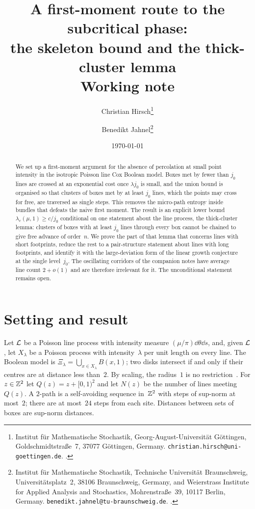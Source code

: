 \documentclass[11pt,letterpaper]{article}
\title{\textbf{A first-moment route to the subcritical phase:\\ the skeleton bound and the thick-cluster lemma}\\[0.6em] \large Working note}
\author{%
  Christian Hirsch\thanks{Institut f\"ur Mathematische Stochastik, Georg-August-Universit\"at G\"ottingen, Goldschmidtstra\ss e~7, 37077 G\"ottingen, Germany. \texttt{christian.hirsch@uni-goettingen.de}. \orcid{0000-0003-4136-3740}.}
  \and
  Benedikt Jahnel\thanks{Institut f\"ur Mathematische Stochastik, Technische Universit\"at Braunschweig, Universit\"atsplatz~2, 38106 Braunschweig, Germany, and Weierstrass Institute for Applied Analysis and Stochastics, Mohrenstra\ss e~39, 10117 Berlin, Germany. \texttt{benedikt.jahnel@tu-braunschweig.de}. \orcid{0000-0002-4212-0065}.}%
}
\date{\today}
\begin{document}
\maketitle
\thispagestyle{plain}

\begin{abstract}
We set up a first-moment argument for the absence of percolation at small point intensity in the isotropic Poisson line Cox Boolean model. Boxes met by fewer than $j_0$ lines are crossed at an exponential cost once $\lambda j_0$ is small, and the union bound is organised so that clusters of boxes met by at least $j_0$ lines, which the points may cross for free, are traversed as single steps. This removes the micro-path entropy inside bundles that defeats the naive first moment. The result is an explicit lower bound $\lambda_c(\mu,1)\ge c/j_0$ conditional on one statement about the line process, the thick-cluster lemma: clusters of boxes with at least $j_0$ lines through every box cannot be chained to give free advance of order~$n$. We prove the part of that lemma that concerns lines with short footprints, reduce the rest to a pair-structure statement about lines with long footprints, and identify it with the large-deviation form of the linear growth conjecture at the single level~$j_0$. The oscillating corridors of the companion notes have average line count $2+o(1)$ and are therefore irrelevant for it. The unconditional statement remains open.
\end{abstract}

\section{Setting and result}
\label{sec:setting}

Let $\mathcal L$ be a Poisson line process with intensity measure $(\mu/\pi)\dd\theta\dd s$, and, given $\mathcal L$, let $X_\lambda$ be a Poisson process with intensity~$\lambda$ per unit length on every line. The Boolean model is $\Xi_\lambda=\bigcup_{x\in X_\lambda}B(x,1)$; two disks intersect if and only if their centres are at distance less than~$2$. By scaling, the radius~$1$ is no restriction~\cite[Proposition~3.1]{HJ26b}. For $z\in\mathbb Z^2$ let $Q(z)=z+[0,1)^2$ and let $N(z)$ be the number of lines meeting~$Q(z)$. A $2$-path is a self-avoiding sequence in~$\mathbb Z^2$ with steps of sup-norm at most~$2$; there are at most~$24$ steps from each site. Distances between sets of boxes are sup-norm distances.
\end{document}
